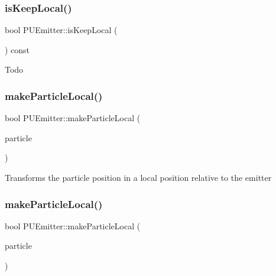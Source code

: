 \subsubsection{\texorpdfstring{is\+Keep\+Local()}{isKeepLocal()}\hspace{0.1cm}{\footnotesize\ttfamily [2/2]}}
{\footnotesize\ttfamily bool P\+U\+Emitter\+::is\+Keep\+Local (\begin{DoxyParamCaption}\item[{void}]{ }\end{DoxyParamCaption}) const}

Todo \mbox{\label{classPUEmitter_a100dc4d1701077246a469bf30f0b483f}} 
\subsubsection{\texorpdfstring{make\+Particle\+Local()}{makeParticleLocal()}\hspace{0.1cm}{\footnotesize\ttfamily [1/2]}}
{\footnotesize\ttfamily bool P\+U\+Emitter\+::make\+Particle\+Local (\begin{DoxyParamCaption}\item[{\hyperlink{structPUParticle3D}{P\+U\+Particle3D} $\ast$}]{particle }\end{DoxyParamCaption})}

Transforms the particle position in a local position relative to the emitter \mbox{\label{classPUEmitter_a100dc4d1701077246a469bf30f0b483f}} 
\subsubsection{\texorpdfstring{make\+Particle\+Local()}{makeParticleLocal()}\hspace{0.1cm}{\footnotesize\ttfamily [2/2]}}
{\footnotesize\ttfamily bool P\+U\+Emitter\+::make\+Particle\+Local (\begin{DoxyParamCaption}\item[{\hyperlink{structPUParticle3D}{P\+U\+Particle3D} $\ast$}]{particle }\end{DoxyParamCaption})}

